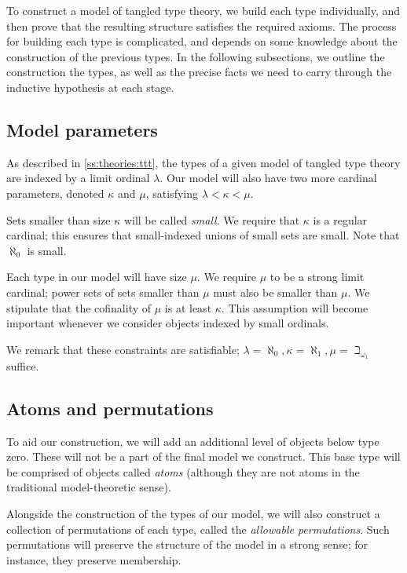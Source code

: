 To construct a model of tangled type theory, we build each type individually, and then prove that the resulting structure satisfies the required axioms.
The process for building each type is complicated, and depends on some knowledge about the construction of the previous types.
In the following subsections, we outline the construction the types, as well as the precise facts we need to carry through the inductive hypothesis at each stage.

\subsection{Model parameters}
\label{ss:outline:params}

As described in \cref{ss:theories:ttt}, the types of a given model of tangled type theory are indexed by a limit ordinal \( \lambda \).
Our model will also have two more cardinal parameters, denoted \( \kappa \) and \( \mu \), satisfying \( \lambda < \kappa < \mu \).

Sets smaller than size \( \kappa \) will be called \emph{small}.
We require that \( \kappa \) is a regular cardinal; this ensures that small-indexed unions of small sets are small.
Note that \( \aleph_0 \) is small.

Each type in our model will have size \( \mu \).
We require \( \mu \) to be a strong limit cardinal; power sets of sets smaller than \( \mu \) must also be smaller than \( \mu \).
We stipulate that the cofinality of \( \mu \) is at least \( \kappa \).
This assumption will become important whenever we consider objects indexed by small ordinals.

We remark that these constraints are satisfiable; \( \lambda = \aleph_0, \kappa = \aleph_1, \mu = \beth_{\omega_1} \) suffice.

\subsection{Atoms and permutations}
\label{ss:outline:atoms}

To aid our construction, we will add an additional level of objects below type zero.
These will not be a part of the final model we construct.
This base type will be comprised of objects called \emph{atoms} (although they are not atoms in the traditional model-theoretic sense).

Alongside the construction of the types of our model, we will also construct a collection of permutations of each type, called the \emph{allowable permutations}.
Such permutations will preserve the structure of the model in a strong sense; for instance, they preserve membership.

